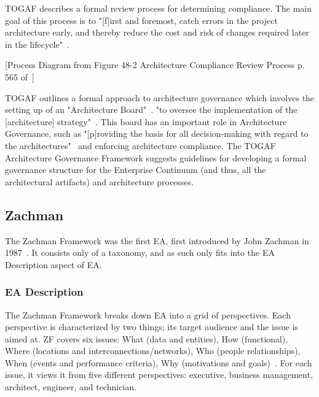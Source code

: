 TOGAF describes a formal review process for determining compliance. The main goal of this process is to "[f]irst and foremost, catch errors in the project architecture early, and thereby reduce the cost and risk of changes required later in the lifecycle"~\cite{togaf9.1}.

[Process Diagram from Figure 48-2 Architecture Compliance Review Process p. 565 of~\cite{togaf9.1}]


TOGAF outlines a formal approach to architecture governance which involves the setting up of an "Architecture Board"~\cite{togaf9.1}. "to oversee the implementation of the [architecture] strategy"~\cite{togaf9.1}. This board has an important role in Architecture Governance, such as "[p]roviding the basis for all decision-making with regard to the architectures"~\cite{togaf9.1} and enforcing architecture compliance. The TOGAF Architecture Governance Framework suggests guidelines for developing a formal governance structure for the Enterprise Continuum (and thus, all the architectural artifacts) and architecture processes. 



%

\subsection{Zachman}
The Zachman Framework was the first EA, first introduced by John Zachman in 1987~\cite{sessions2007,zachman}. It consists only of a taxonomy, and as such only fits into the EA Description aspect of EA. 

\subsubsection{EA Description}



The Zachman Framework breaks down EA into a grid of perspectives. Each perspective is characterized by two things; its target audience and the issue is aimed at. ZF covers six issues: What (data and entities), How (functional), Where (locations and interconnections/networks), Who (people relationships), When (events and performance criteria), Why (motivations and goals)~\cite{jungle2004}. For each issue, it views it from five different perspectives: executive, business management, architect, engineer, and technician. 

